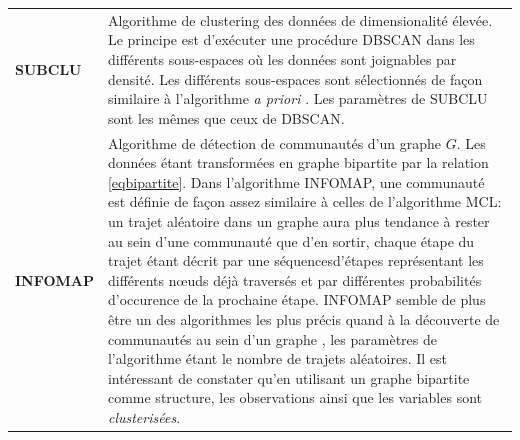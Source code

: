 \begin{longtable}{ @{\hspace{-2.7cm}} >{\bfseries}p{}|>{\small}p{\textwidth}}
	\\[0.4cm]
     SUBCLU & \citep{Vista2004} Algorithme de clustering des données de dimensionalité élevée. Le principe est d'exécuter une procédure DBSCAN dans les différents sous-espaces où les données sont joignables par densité. Les différents sous-espaces sont sélectionnés de façon similaire à l'algorithme \textit{a priori} \citep{agrawal1994fast}. Les paramètres de SUBCLU sont les mêmes que ceux de DBSCAN.
	\\[0.4cm]
     INFOMAP & \citep{rosvall2008maps} Algorithme de détection de communautés d'un graphe $G$. Les données étant transformées en graphe bipartite par la relation \ref{eqbipartite}. Dans l'algorithme INFOMAP, une communauté est définie de façon assez similaire à celles de l'algorithme MCL: un trajet aléatoire dans un graphe aura plus tendance à rester au sein d'une communauté que d'en sortir, chaque étape du trajet étant décrit par une séquencesd'étapes représentant les différents nœuds déjà traversés et par différentes probabilités d'occurence de la prochaine étape. INFOMAP semble de plus être un des algorithmes les plus précis quand à la découverte de communautés au sein d'un graphe \citep{lancichinetti2009community}, les paramètres de l'algorithme étant le nombre de trajets aléatoires. Il est intéressant de constater qu'en utilisant un graphe bipartite comme structure, les observations ainsi que les variables sont \textit{clusterisées}.
\end{longtable}
    
